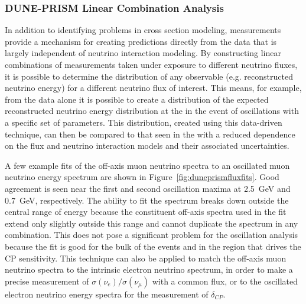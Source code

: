 \subsubsection{DUNE-PRISM Linear Combination Analysis}

In addition to identifying problems in cross section modeling,  measurements provide a mechanism for creating   predictions directly from the   data that is largely independent of neutrino interaction modeling. By constructing linear combinations of measurements taken under exposure to different neutrino fluxes, it is possible to determine the distribution of any observable (e.g. reconstructed neutrino energy) for a different neutrino flux of interest. This means, for example, from the  data alone it is possible to create a distribution of the expected reconstructed neutrino energy distribution at the  in the event of oscillations with a specific set of parameters.  This distribution, created using this data-driven technique, can then be compared to that seen in the  with a reduced dependence on the flux and neutrino interaction models and their associated uncertainties.



A few example fits of the off-axis  muon neutrino spectra to an oscillated   muon neutrino energy spectrum are shown in Figure~\ref{fig:duneprismfluxfits}. Good agreement is seen near the first and second oscillation maxima at 2.5~GeV and 0.7~GeV, respectively. The ability to fit the  spectrum breaks down outside the central range of energy because the constituent off-axis spectra used in the fit extend only slightly outside this range and cannot duplicate the spectrum in any combination.  This does not pose a significant problem for the oscillation analysis because the fit is good for the bulk of the events and in the region that drives the CP sensitivity.  This technique can also be applied to match the off-axis muon neutrino spectra to the   intrinsic electron neutrino spectrum, in order to make a precise measurement of $\sigma(\nu_e)/\sigma(\nu_\mu)$ with a common flux, or to the   oscillated electron neutrino energy spectra for the measurement of $\delta_{CP}$.

